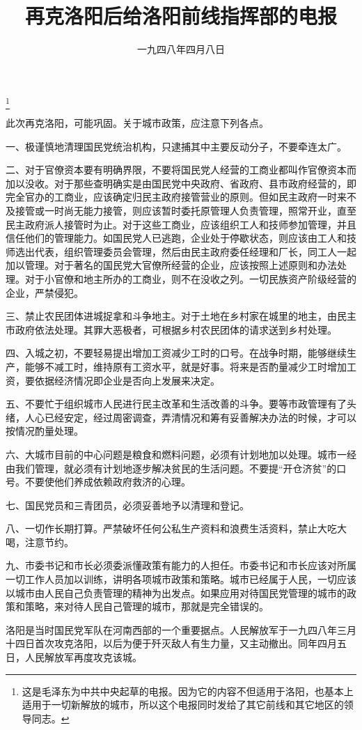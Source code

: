 
\title{再克洛阳后给洛阳前线指挥部的电报}
\date{一九四八年四月八日}
\thanks{这是毛泽东为中共中央起草的电报。因为它的内容不但适用于洛阳，也基本上适用于一切新解放的城市，所以这个电报同时发给了其它前线和其它地区的领导同志。}
\maketitle


此次再克洛阳，可能巩固。关于城市政策，应注意下列各点。

一、极谨慎地清理国民党统治机构，只逮捕其中主要反动分子，不要牵连太广。

二、对于官僚资本要有明确界限，不要将国民党人经营的工商业都叫作官僚资本而加以没收。对于那些查明确实是由国民党中央政府、省政府、县市政府经营的，即完全官办的工商业，应该确定归民主政府接管营业的原则。但如民主政府一时来不及接管或一时尚无能力接管，则应该暂时委托原管理人负责管理，照常开业，直至民主政府派人接管时为止。对于这些工商业，应该组织工人和技师参加管理，并且信任他们的管理能力。如国民党人已逃跑，企业处于停歇状态，则应该由工人和技师选出代表，组织管理委员会管理，然后由民主政府委任经理和厂长，同工人一起加以管理。对于著名的国民党大官僚所经营的企业，应该按照上述原则和办法处理。对于小官僚和地主所办的工商业，则不在没收之列。一切民族资产阶级经营的企业，严禁侵犯。

三、禁止农民团体进城捉拿和斗争地主。对于土地在乡村家在城里的地主，由民主市政府依法处理。其罪大恶极者，可根据乡村农民团体的请求送到乡村处理。

四、入城之初，不要轻易提出增加工资减少工时的口号。在战争时期，能够继续生产，能够不减工时，维持原有工资水平，就是好事。将来是否酌量减少工时增加工资，要依据经济情况即企业是否向上发展来决定。

五、不要忙于组织城市人民进行民主改革和生活改善的斗争。要等市政管理有了头绪，人心已经安定，经过周密调查，弄清情况和筹有妥善解决办法的时候，才可以按情况酌量处理。

六、大城市目前的中心问题是粮食和燃料问题，必须有计划地加以处理。城市一经由我们管理，就必须有计划地逐步解决贫民的生活问题。不要提“开仓济贫”的口号。不要使他们养成依赖政府救济的心理。

七、国民党员和三青团员，必须妥善地予以清理和登记。

八、一切作长期打算。严禁破坏任何公私生产资料和浪费生活资料，禁止大吃大喝，注意节约。

九、市委书记和市长必须委派懂政策有能力的人担任。市委书记和市长应该对所属一切工作人员加以训练，讲明各项城市政策和策略。城市已经属于人民，一切应该以城市由人民自己负责管理的精神为出发点。如果应用对待国民党管理的城市的政策和策略，来对待人民自己管理的城市，那就是完全错误的。


\begin{maonote}
洛阳是当时国民党军队在河南西部的一个重要据点。人民解放军于一九四八年三月十四日首次攻克洛阳，以后为便于歼灭敌人有生力量，又主动撤出。同年四月五日，人民解放军再度攻克该城。
\end{maonote}
